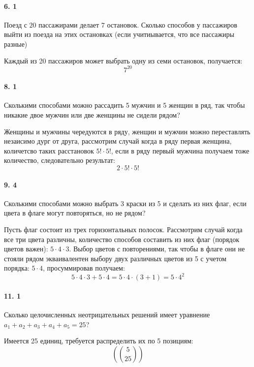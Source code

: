 \documentclass[a4paper,12pt]{article}
\begin{document}
\paragraph{6. 1} Поезд с $20$ пассажирами делает $7$ остановок. Сколько способов у пассажиров выйти из поезда на этих остановках (если учитиывается, что все пассажиры разные)
\begin{Solution}
Каждый из 20 пассажиров может выбрать одну из семи остановок, получается:
\[
	7^{20}
\]
\end{Solution}

\paragraph{8. 1} Сколькими способами можно рассадить 5 мужчин и 5 женщин в ряд, так чтобы никакие двое мужчин или две женщины не сидели рядом?
\begin{Solution}
Женщины и мужчины чередуются в ряду, женщин и мужчин можно переставлять незаисимо дург от друга, рассмотрим случай когда в ряду первая женщина, количетсво таких расстановок $5! \cdot 5!$, если в ряду первый мужчина получаем тоже количество, следовательно результат:
\[
	2 \cdot 5! \cdot 5!
\]
\end{Solution}

\paragraph{9. 4} Сколькими способами можно выбрать 3 краски из 5 и сделать из них флаг, если цвета в флаге могут повторяться, но не рядом?
\begin{Solution}
Пусть флаг состоит из трех горизонтальных полосок. Рассмотрим случай когда все три цвета различны, количество способов составить из них флаг (порядок цветов важен): $5 \cdot 4 \cdot 3$. Выбор цветов с повторениями, так чтобы в флаге они не стояли рядом экваивалентен выбору двух различных цветов из 5 с учетом порядка: $5 \cdot 4$, просуммировав получаем:
\[
	5 \cdot 4 \cdot 3 + 5 \cdot 4 = 5 \cdot 4 \cdot \left( 3 + 1 \right) = 5 \cdot 4^2
\]
\end{Solution}

\paragraph{11. 1} Сколько целочисленных неотрицательных решений имеет уравнение $a_1 + a_2 + a_3 + a_4 + a_5 = 25$?
\begin{Solution}
Имеется 25 единиц, требуется распределить их по 5 позициям:
\[
	\left( \binom{5}{25} \right)
\]
\end{Solution}
\end{document}
